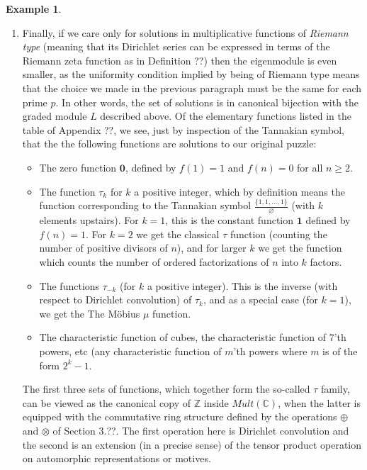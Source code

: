 \documentclass[a4paper]{article}
\theoremstyle{definition}
\newtheorem{example}{Example}[section]
\theoremstyle{remark}
\newcommand{\one}{\mathbf{1}}
\newcommand{\zero}{\mathbf{0}}
\newcommand{\C}{\mathbb{C}}
\begin{document}
\begin{example}
\begin{enumerate}
\item Finally, if we care only for solutions in multiplicative functions of \emph{Riemann type} (meaning that its Dirichlet series can be expressed in terms of the Riemann zeta function as in Definition ??) then the eigenmodule is even smaller, as the uniformity condition implied by being of Riemann type means that the choice we made in the previous paragraph must be the same for each prime $p$. In other words, the set of solutions is in canonical bijection with the graded module $L$ described above. Of the elementary functions listed in the table of Appendix ??, we see, just by inspection of the Tannakian symbol, that the the following functions are solutions to our original puzzle:
\begin{itemize}
\item The zero function $\zero$, defined by $f(1) = 1$ and $f(n) = 0$ for all $n \geq 2$. 
\item The function $\tau_k$ for $k$ a positive integer, which by definition means the function corresponding to the Tannakian symbol $\frac{ \{1, 1, \ldots, 1 \} }{ \varnothing  }$ (with $k$ elements upstairs). For $k=1$, this is the constant function $\one$ defined by $f(n) = 1$. For $k = 2$ we get the classical $\tau$ function (counting the number of positive divisors of $n$), and for larger $k$ we get the function which counts the number of ordered factorizations of $n$ into $k$ factors.
\item The functions $\tau_{-k}$ (for $k$ a positive integer). This is the inverse (with respect to Dirichlet convolution) of $\tau_k$, and as a special case (for $k=1$), we get the The M{\"o}bius $\mu$ function.
\item The characteristic function of cubes, the characteristic function of $7$'th powers, etc (any characteristic function of $m$'th powers where $m$ is of the form $2^k-1$. 
\end{itemize}

The first three sets of functions, which together form the so-called $\tau$ family, can be viewed as the canonical copy of $\mathbb{Z}$ inside $Mult(\C)$, when the latter is equipped with the commutative ring structure defined by the operations $\oplus$ and $\otimes$ of Section 3.??. The first operation here is Dirichlet convolution and the second is an extension (in a precise sense) of the tensor product operation on automorphic representations or motives.



\end{enumerate}


\end{example}
\end{document}
